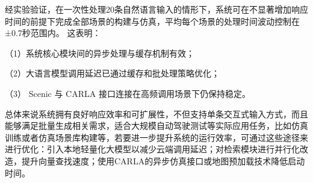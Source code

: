 经实验验证，在一次性处理20条自然语言输入的情形下，系统可在不显著增加响应时间的前提下完成全部场景的构建与仿真，平均每个场景的处理时间波动控制在±0.7秒范围内。
这表明：

（1）系统核心模块间的异步处理与缓存机制有效；

（2）大语言模型调用延迟已通过缓存和批处理策略优化；

（3） Scenic 与 CARLA 接口连接在高频调用场景下仍保持稳定。

总体来说系统拥有良好响应效率和可扩展性，不但支持单条交互式输入方式，而且能够满足批量生成相关需求，适合大规模自动驾驶测试等实际应用任务，比如仿真训练或者仿真场景库构建等，若要进一步提升系统的运行效率，可通过这些途径来进行优化：引入本地轻量化大模型以减少云端调用延迟；对检索模块进行并行化改造，提升向量查找速度；使用CARLA的异步仿真接口或地图预加载技术降低启动时间。











	

	


